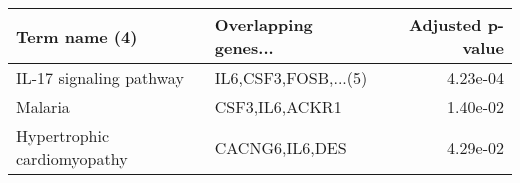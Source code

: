 \begin{tabular}{llr}
\toprule
              Term name (4) & Overlapping genes... &  Adjusted p-value \\
\midrule
    IL-17 signaling pathway & IL6,CSF3,FOSB,...(5) &          4.23e-04 \\
                    Malaria &       CSF3,IL6,ACKR1 &          1.40e-02 \\
Hypertrophic cardiomyopathy &       CACNG6,IL6,DES &          4.29e-02 \\
\bottomrule
\end{tabular}
